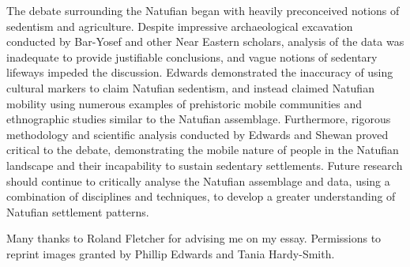 \documentclass[%
	]{ijsra}
\begin{document}
The debate surrounding the Natufian began with heavily preconceived notions of sedentism and agriculture. Despite impressive archaeological excavation conducted by Bar-Yosef and other Near Eastern scholars, analysis of the data was inadequate to provide justifiable conclusions, and vague notions of sedentary lifeways impeded the discussion. Edwards demonstrated the inaccuracy of using cultural markers to claim Natufian sedentism, and instead claimed Natufian mobility using numerous examples of prehistoric mobile communities and ethnographic studies similar to the Natufian assemblage. Furthermore, rigorous methodology and scientific analysis conducted by Edwards and Shewan proved critical to the debate, demonstrating the mobile nature of people in the Natufian landscape and their incapability to sustain sedentary settlements. Future research should continue to critically analyse the Natufian assemblage and data, using a combination of disciplines and techniques, to develop a greater understanding of Natufian settlement patterns.

\IJSRAseparator

Many thanks to Roland Fletcher for advising me on my essay. 
Permissions to reprint images granted by Phillip Edwards and Tania Hardy-Smith.
\IJSRAclosing%
\end{document}
